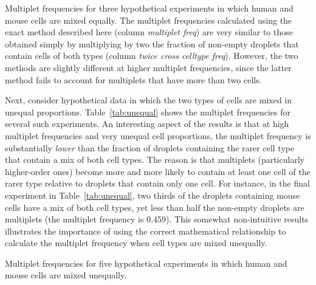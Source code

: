 \documentclass[fleqn,10pt]{wlpeerj} %
\begin{document}
\begin{table}[b]
\centering

\caption{\label{tab:equal}
Multiplet frequencies for three hypothetical experiments in which human and mouse cells are mixed equally.
The multiplet frequencies calculated using the exact method described here (column \emph{multiplet freq}) are very similar to those obtained simply by multiplying by two the fraction of non-empty droplets that contain cells of both types (column \emph{twice cross celltype freq}).
However, the two methods are slightly different at higher multiplet frequencies, since the latter method fails to account for multiplets that have more than two cells.}
\end{table}

Next, consider hypothetical data in which the two types of cells are mixed in unequal proportions.
Table~\ref{tab:unequal} shows the multiplet frequencies for several such experiments.
An interesting aspect of the results is that at high multiplet frequencies and very unequal cell proportions, the multiplet frequency is substantially \emph{lower} than the fraction of droplets containing the rarer cell type that contain a mix of both cell types.
The reason is that multiplets (particularly higher-order ones) become more and more likely to contain at least one cell of the rarer type relative to droplets that contain only one cell.
For instance, in the final experiment in Table~\ref{tab:unequal}, two thirds of the droplets containing mouse cells have a mix of both cell types, yet less than half the non-empty droplets are multiplets (the multiplet frequency is 0.459).
This somewhat non-intuitive results illustrates the importance of using the correct mathematical relationship to calculate the multiplet frequency when cell types are mixed unequally.

\begin{table}[t]
\centering

\caption{\label{tab:unequal}
Multiplet frequencies for five hypothetical experiments in which human and mouse cells are mixed unequally.}
\end{table}
\end{document}
